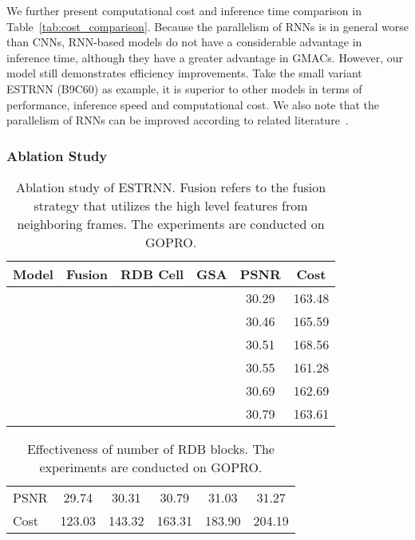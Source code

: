 \documentclass[twocolumn]{svjour3}          \smartqed  \usepackage{graphicx}
\begin{document}
We further present computational cost and inference time comparison in Table~\ref{tab:cost_comparison}. Because the parallelism of RNNs is in general worse than CNNs, RNN-based models do not have a considerable advantage in inference time, although they have a greater advantage in GMACs. However, our model still demonstrates efficiency improvements. Take the small variant ESTRNN (B9C60) as example, it is superior to other models in terms of performance, inference speed and computational cost. We also note that the parallelism of RNNs can be improved according to related literature~\cite{lei2017simple,yu2018sliced}.

\subsubsection{Ablation Study}

\begin{table}[!ht]
	\caption{Ablation study of ESTRNN. Fusion refers to the fusion strategy that utilizes the high level features from neighboring frames. The experiments are conducted on GOPRO.}
	\label{table:ablation}
	\centering
	\begin{tabular}{lccccc}
		\toprule
		Model & Fusion & RDB Cell & GSA & PSNR & Cost\\
		\midrule
		 &  &  &  & 30.29 & 163.48 \\
		 & \checkmark &  &  & 30.46 & 165.59 \\
		 &  & \checkmark &  & 30.51 & 168.56 \\
		 & \checkmark & \checkmark &  & 30.55 & 161.28 \\
		 &  & \checkmark & \checkmark & 30.69 & 162.69 \\
		 & \checkmark & \checkmark & \checkmark & 30.79 & 163.61 \\
		\bottomrule
	\end{tabular}
\end{table}

\begin{table}[!ht]
	\caption{Effectiveness of number of RDB blocks. The experiments are conducted on GOPRO.}
	\label{table:blocks}
	\centering
	\begin{tabular}{lccccc}
		\toprule
		&  &  &  &  & \\
		\midrule
		PSNR & 29.74 & 30.31 & 30.79 & 31.03 & 31.27 \\
		Cost & 123.03 & 143.32 & 163.31 & 183.90 & 204.19 \\
		\bottomrule
	\end{tabular}
\end{table}
\end{document}
